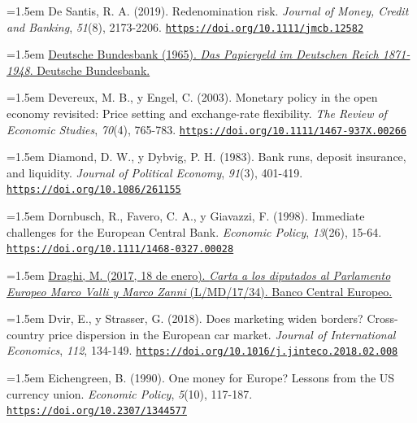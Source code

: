 \documentclass[10pt,a4paper]{article}
\begin{document}
\noindent\hangindent=1.5em De Santis, R. A. (2019). Redenomination risk. \textit{Journal of Money, Credit and Banking}, \textit{51}(8), 2173-2206. \href{https://doi.org/10.1111/jmcb.12582}{\nolinkurl{https://doi.org/10.1111/jmcb.12582}}

\noindent\hangindent=1.5em \href{https://bundesbank.de/resource/blob/607868/195d1b540a2053d42fe9f2b735835115/472B63F073F071307366337C94F8C870/das-papiergeld-im-deutschen-reich-data.pdf}{Deutsche Bundesbank (1965). \textit{Das Papiergeld im Deutschen Reich 1871-1948}. Deutsche Bundesbank.}

\noindent\hangindent=1.5em Devereux, M. B., y Engel, C. (2003). Monetary policy in the open economy revisited: Price setting and exchange-rate flexibility. \textit{The Review of Economic Studies}, \textit{70}(4), 765-783. \href{https://doi.org/10.1111/1467-937X.00266}{\nolinkurl{https://doi.org/10.1111/1467-937X.00266}}

\noindent\hangindent=1.5em Diamond, D. W., y Dybvig, P. H. (1983). Bank runs, deposit insurance, and liquidity. \textit{Journal of Political Economy}, \textit{91}(3), 401-419. \href{https://doi.org/10.1086/261155}{\nolinkurl{https://doi.org/10.1086/261155}}

\noindent\hangindent=1.5em Dornbusch, R., Favero, C. A., y Giavazzi, F. (1998). Immediate challenges for the European Central Bank. \textit{Economic Policy}, \textit{13}(26), 15-64. \href{https://doi.org/10.1111/1468-0327.00028}{\nolinkurl{https://doi.org/10.1111/1468-0327.00028}}

\noindent\hangindent=1.5em \href{https://www.ecb.europa.eu/pub/pdf/other/170120letter_valli_zanni_1.en.pdf}{Draghi, M. (2017, 18 de enero). \textit{Carta a los diputados al Parlamento Europeo Marco Valli y Marco Zanni} (L/MD/17/34). Banco Central Europeo.}

\noindent\hangindent=1.5em Dvir, E., y Strasser, G. (2018). Does marketing widen borders? Cross-country price dispersion in the European car market. \textit{Journal of International Economics}, \textit{112}, 134-149. \href{https://doi.org/10.1016/j.jinteco.2018.02.008}{\nolinkurl{https://doi.org/10.1016/j.jinteco.2018.02.008}}

\noindent\hangindent=1.5em Eichengreen, B. (1990). One money for Europe? Lessons from the US currency union. \textit{Economic Policy}, \textit{5}(10), 117-187. \href{https://doi.org/10.2307/1344577}{\nolinkurl{https://doi.org/10.2307/1344577}}
\end{document}
